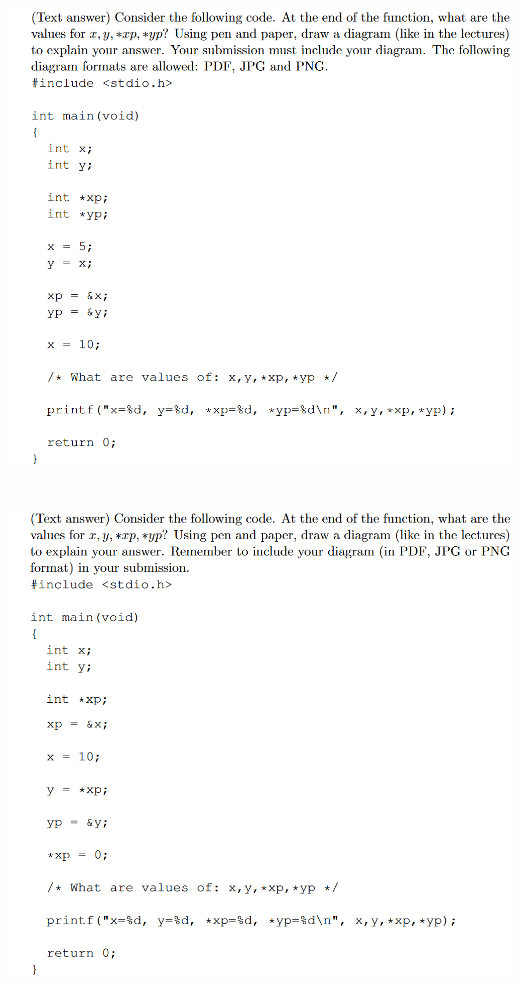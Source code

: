\documentclass{article}
\begin{document}
\section{}
\includegraphics[width=\linewidth, keepaspectratio=true]{task3}
\vspace{2pt}\\

\section{}
\includegraphics[width=\linewidth, keepaspectratio=true]{task4}
\vspace{2pt}\\
\end{document}
